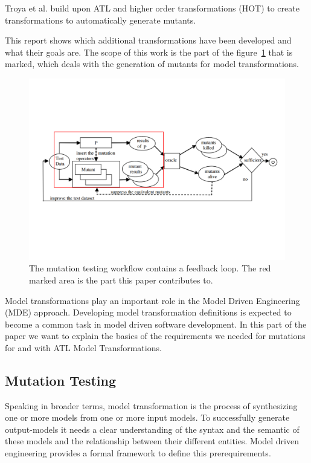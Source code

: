 \documentclass{llncs}
\begin{document}
Troya et al. \cite{troya:2015} build upon ATL and higher order transformations
(HOT) to create transformations to automatically generate mutants.

This report shows which additional transformations have been developed and what
their goals are. The scope of this work is the part of the
figure~\ref{fig:Marked_Mutation_Process} that is marked, which deals with the
generation of mutants for model transformations.

\begin{figure}
	\centering
	\includegraphics[angle=270,width=1\textwidth]{figures/Marked_Mutation_Process.pdf}
	\caption{The mutation testing workflow contains a feedback loop. The red marked area is the part this paper contributes to.\cite{MatMottu2006}}
	\label{fig:Marked_Mutation_Process}
\end{figure}

Model transformations play an important role in the Model Driven Engineering
(MDE) approach. Developing model transformation definitions is expected to
become a common task in model driven software development. \cite{atl:frederic}
In this part of the paper we want to explain the basics of the requirements we needed for mutations for and with ATL Model Transformations.

\subsection{Mutation Testing}

Speaking in broader terms, model transformation is the process of synthesizing one or more models from one or more input models. To successfully generate output-models it needs a clear understanding of the syntax and the semantic of these models and the relationship between their different entities. Model driven engineering provides a formal framework to define this prerequirements.\cite{Sendall:2003}
\end{document}
